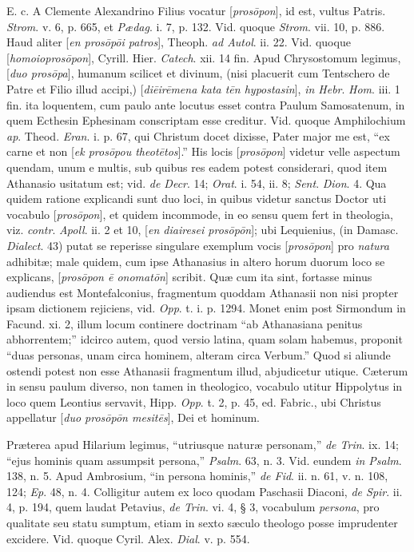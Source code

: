 E. c. A Clemente Alexandrino Filius vocatur [\emph{pros\={o}pon}],
id est, vultus Patris. \emph{Strom}. v. 6, p. 665, et \emph{Pædag}. i.
7, p. 132. Vid. quoque \emph{Strom}. vii. 10, p. 886. Haud aliter [\emph{en
pros\={o}p\={o}i patros}], Theoph. \emph{ad Autol}. ii. 22. Vid.
quoque [\emph{homoiopros\={o}pon}], Cyrill. Hier. \emph{Catech}.
xii. 14 fin. Apud Chrysostomum legimus, [\emph{duo pros\={o}pa}],
humanum scilicet et divinum, (nisi placuerit cum Tentschero de Patre
et Filio illud accipi,) [\emph{di\={e}ir\={e}mena kata t\={e}n
hypostasin}], \emph{in Hebr}. \emph{Hom}. iii. 1 fin. ita loquentem,
cum paulo ante locutus esset contra Paulum Samosatenum, in quem
Ecthesin Ephesinam conscriptam esse creditur. Vid. quoque Amphilochium
\emph{ap}. Theod. \emph{Eran}. i. p. 67, qui Christum docet dixisse,
Pater major me est, ``ex carne et non [\emph{ek pros\={o}pou theot\={e}tos}].''
His locis [\emph{pros\={o}pon}] videtur velle aspectum quendam,
unum e multis, sub quibus res eadem potest considerari, quod item
Athanasio usitatum est; vid. \emph{de Decr}. 14; \emph{Orat}. i. 54,
ii. 8; \emph{Sent}. \emph{Dion}. 4. Qua quidem ratione explicandi sunt
duo loci, in quibus videtur sanctus Doctor uti vocabulo [\emph{pros\={o}pon}],
et quidem incommode, in eo sensu quem fert in theologia, viz. \emph{contr}.
\emph{Apoll}. ii. 2 et 10, [\emph{en diairesei pros\={o}p\={o}n}];
ubi Lequienius, (in Damasc. \emph{Dialect}. 43) putat se
reperisse singulare exemplum vocis [\emph{pros\={o}pon}] pro \emph{natura}
adhibitæ; male quidem, cum ipse Athanasius in altero horum duorum
loco se explicans, [\emph{pros\={o}pon \={e} onomat\={o}n}]
scribit. Quæ cum ita sint, fortasse minus audiendus est
Montefalconius, fragmentum quoddam Athanasii non nisi propter ipsam
dictionem rejiciens, vid. \emph{Opp}. t. i. p. 1294. Monet enim post
Sirmondum in Facund. xi. 2, illum locum continere doctrinam ``ab
Athanasiana penitus abhorrentem;'' idcirco autem, quod versio latina,
quam solam habemus, proponit ``duas personas, unam circa hominem,
alteram circa Verbum.'' Quod si aliunde ostendi potest non esse
Athanasii fragmentum illud, abjudicetur utique. Cæterum in sensu
paulum diverso, non tamen in theologico, vocabulo utitur Hippolytus in
loco quem Leontius servavit, Hipp. \emph{Opp}. t. 2, p. 45, ed.
Fabric., ubi Christus appellatur [\emph{duo pros\={o}p\={o}n mesit\={e}s}],
Dei et hominum.

Præterea apud Hilarium legimus, ``utriusque naturæ
personam,'' \emph{de Trin}. ix. 14; ``ejus hominis quam assumpsit
persona,'' \emph{Psalm}. 63, n. 3. Vid. eundem \emph{in Psalm}. 138, n.
5. Apud Ambrosium, ``in persona hominis,'' \emph{de Fid}. ii. n. 61, v.
n. 108, 124; \emph{Ep}. 48, n. 4. Colligitur autem ex loco quodam
Paschasii Diaconi, \emph{de Spir}. ii. 4, p. 194, quem laudat Petavius,
\emph{de Trin}. vi. 4, § 3, vocabulum \emph{persona}, pro qualitate
seu statu sumptum, etiam in sexto sæculo theologo posse imprudenter
excidere. Vid. quoque Cyril. Alex. \emph{Dial}. v. p. 554.

